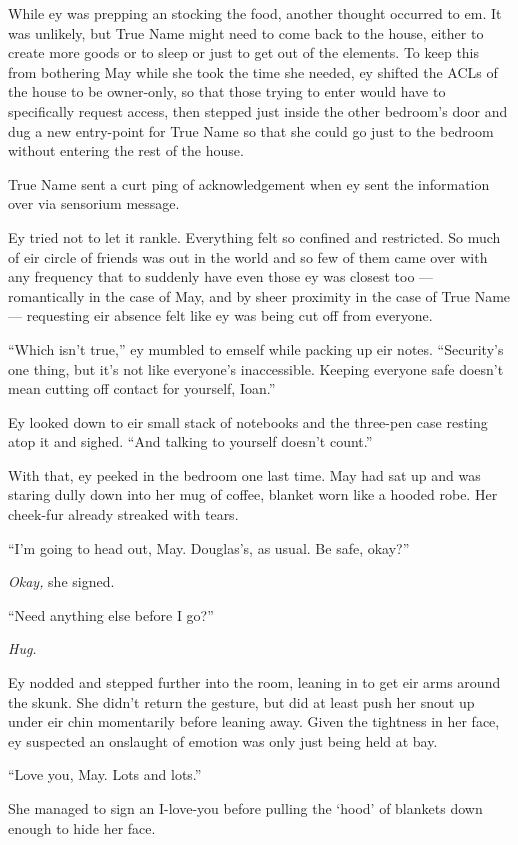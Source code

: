 While ey was prepping an stocking the food, another thought occurred to em. It was unlikely, but True Name might need to come back to the house, either to create more goods or to sleep or just to get out of the elements. To keep this from bothering May while she took the time she needed, ey shifted the ACLs of the house to be owner-only, so that those trying to enter would have to specifically request access, then stepped just inside the other bedroom's door and dug a new entry-point for True Name so that she could go just to the bedroom without entering the rest of the house.

True Name sent a curt ping of acknowledgement when ey sent the information over via sensorium message.

Ey tried not to let it rankle. Everything felt so confined and restricted. So much of eir circle of friends was out in the world and so few of them came over with any frequency that to suddenly have even those ey was closest too — romantically in the case of May, and by sheer proximity in the case of True Name — requesting eir absence felt like ey was being cut off from everyone.

``Which isn't true,'' ey mumbled to emself while packing up eir notes. ``Security's one thing, but it's not like everyone's inaccessible. Keeping everyone safe doesn't mean cutting off contact for yourself, Ioan.''

Ey looked down to eir small stack of notebooks and the three-pen case resting atop it and sighed. ``And talking to yourself doesn't count.''

With that, ey peeked in the bedroom one last time. May had sat up and was staring dully down into her mug of coffee, blanket worn like a hooded robe. Her cheek-fur already streaked with tears.

``I'm going to head out, May. Douglas's, as usual. Be safe, okay?''

\emph{Okay,} she signed.

``Need anything else before I go?''

\emph{Hug.}

Ey nodded and stepped further into the room, leaning in to get eir arms around the skunk. She didn't return the gesture, but did at least push her snout up under eir chin momentarily before leaning away. Given the tightness in her face, ey suspected an onslaught of emotion was only just being held at bay.

``Love you, May. Lots and lots.''

She managed to sign an I-love-you before pulling the `hood' of blankets down enough to hide her face.

